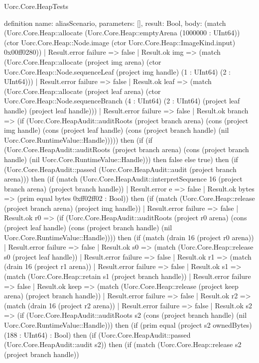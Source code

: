 \begin{lexlean}{Uorc.Core.HeapTests}
\begin{semanticmodule}
definition{
  name: aliasScenario,
  parameters: [],
  result: Bool,
  body: (match (Uorc.Core.Heap::allocate (Uorc.Core.Heap::emptyArena (1000000 : UInt64)) (ctor Uorc.Core.Heap::Node.image (ctor Uorc.Core.Heap::ImageKind.input) 0x00ff0280))
    | Result.error failure => false
    | Result.ok img => (match (Uorc.Core.Heap::allocate (project img arena) (ctor Uorc.Core.Heap::Node.sequenceLeaf (project img handle) (1 : UInt64) (2 : UInt64)))
      | Result.error failure => false
      | Result.ok leaf => (match (Uorc.Core.Heap::allocate (project leaf arena) (ctor Uorc.Core.Heap::Node.sequenceBranch (4 : UInt64) (2 : UInt64) (project leaf handle) (project leaf handle)))
        | Result.error failure => false
        | Result.ok branch => (if (Uorc.Core.HeapAudit::auditRoots (project branch arena) (cons (project img handle) (cons (project leaf handle) (cons (project branch handle) (nil Uorc.Core.RuntimeValue::Handle))))) then (if (if (Uorc.Core.HeapAudit::auditRoots (project branch arena) (cons (project branch handle) (nil Uorc.Core.RuntimeValue::Handle))) then false else true) then (if (Uorc.Core.HeapAudit::passed (Uorc.Core.HeapAudit::audit (project branch arena))) then (if (match (Uorc.Core.HeapAudit::interpretSequence 16 (project branch arena) (project branch handle))
          | Result.error e => false
          | Result.ok bytes => (prim equal bytes 0xff02ff02 : Bool)) then (if (match (Uorc.Core.Heap::release (project branch arena) (project img handle))
          | Result.error failure => false
          | Result.ok r0 => (if (Uorc.Core.HeapAudit::auditRoots (project r0 arena) (cons (project leaf handle) (cons (project branch handle) (nil Uorc.Core.RuntimeValue::Handle)))) then (if (match (drain 16 (project r0 arena))
            | Result.error failure => false
            | Result.ok s0 => (match (Uorc.Core.Heap::release s0 (project leaf handle))
              | Result.error failure => false
              | Result.ok r1 => (match (drain 16 (project r1 arena))
                | Result.error failure => false
                | Result.ok s1 => (match (Uorc.Core.Heap::retain s1 (project branch handle))
                  | Result.error failure => false
                  | Result.ok keep => (match (Uorc.Core.Heap::release (project keep arena) (project branch handle))
                    | Result.error failure => false
                    | Result.ok r2 => (match (drain 16 (project r2 arena))
                      | Result.error failure => false
                      | Result.ok s2 => (if (Uorc.Core.HeapAudit::auditRoots s2 (cons (project branch handle) (nil Uorc.Core.RuntimeValue::Handle))) then (if (prim equal (project s2 ownedBytes) (188 : UInt64) : Bool) then (if (Uorc.Core.HeapAudit::passed (Uorc.Core.HeapAudit::audit s2)) then (if (match (Uorc.Core.Heap::release s2 (project branch handle))
}
\end{semanticmodule}
\end{lexlean}
